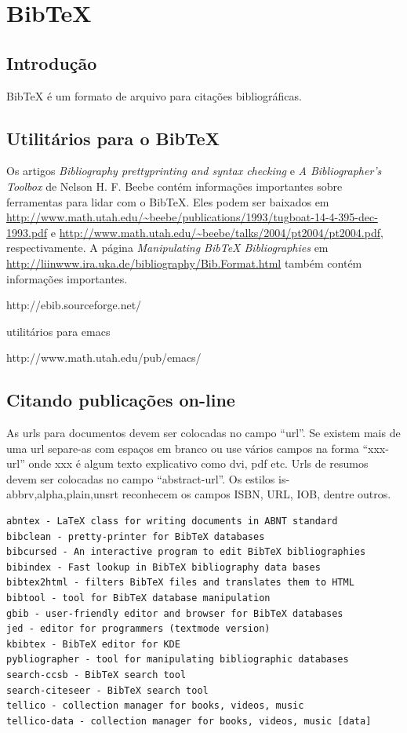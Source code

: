 \documentclass[12pt,brazil]{book}
\begin{document}
\chapter{BibTeX}
\label{cha:bibtex}

\section{Introdução}
\label{sec:introducao-1}

BibTeX é um formato de arquivo para citações bibliográficas.

\section{Utilitários para o BibTeX}
\label{sec:utilitarios-para-o}

Os artigos \textit{Bibliography prettyprinting and syntax checking} e
\textit{A Bibliographer's Toolbox} de Nelson H. F. Beebe contém
informações importantes sobre ferramentas para lidar com o BibTeX.
Eles podem ser baixados em
\url{http://www.math.utah.edu/~beebe/publications/1993/tugboat-14-4-395-dec-1993.pdf}
 e \url{http://www.math.utah.edu/~beebe/talks/2004/pt2004/pt2004.pdf},
respectivamente. A página \textit{Manipulating BibTeX Bibliographies}
em \url{http://liinwww.ira.uka.de/bibliography/Bib.Format.html} também
contém informações importantes.

http://ebib.sourceforge.net/

utilitários para emacs

http://www.math.utah.edu/pub/emacs/

\section{Citando publicações on-line}
\label{sec:citando-publ-line}

As urls para documentos devem ser colocadas no campo ``url''. Se
existem mais de uma url separe-as com espaços em branco ou use vários
campos na forma ``xxx-url'' onde xxx é algum texto explicativo como
dvi, pdf etc. Urls de resumos devem ser colocadas no campo
``abstract-url''. Os estilos is-{abbrv,alpha,plain,unsrt} reconhecem
os campos ISBN, URL, IOB, dentre outros.

\begin{verbatim}
abntex - LaTeX class for writing documents in ABNT standard
bibclean - pretty-printer for BibTeX databases
bibcursed - An interactive program to edit BibTeX bibliographies
bibindex - Fast lookup in BibTeX bibliography data bases
bibtex2html - filters BibTeX files and translates them to HTML
bibtool - tool for BibTeX database manipulation
gbib - user-friendly editor and browser for BibTeX databases
jed - editor for programmers (textmode version)
kbibtex - BibTeX editor for KDE
pybliographer - tool for manipulating bibliographic databases
search-ccsb - BibTeX search tool
search-citeseer - BibTeX search tool
tellico - collection manager for books, videos, music
tellico-data - collection manager for books, videos, music [data]
\end{verbatim}
\end{document}
